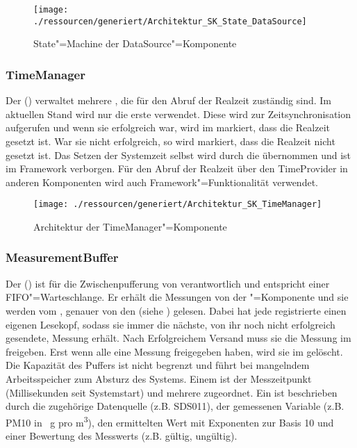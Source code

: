 \begin{figure}[!htb]
    \centering
    \texttt{[image: ./ressourcen/generiert/Architektur\_SK\_State\_DataSource]}
    \caption{State"=Machine der DataSource"=Komponente}
    \label{fig:Architektur_SK_State_DataSource}
\end{figure}

\subsubsection{TimeManager}
Der  () verwaltet mehrere , die für den Abruf der Realzeit zuständig sind.
Im aktuellen Stand wird nur die erste  verwendet.
Diese wird zur Zeitsynchronisation aufgerufen und wenn sie erfolgreich war, wird im  markiert, dass die Realzeit gesetzt ist.
War sie nicht erfolgreich, so wird markiert, dass die Realzeit nicht gesetzt ist.
Das Setzen der Systemzeit selbst wird durch die  übernommen und ist im Framework verborgen.
Für den Abruf der Realzeit über den TimeProvider in anderen Komponenten wird auch Framework"=Funktionalität verwendet.

\begin{figure}[!htb]
\centering
\texttt{[image: ./ressourcen/generiert/Architektur\_SK\_TimeManager]}
\caption{Architektur der TimeManager"=Komponente}
\label{fig:Architektur_SK_TimeManager}
\end{figure}

\subsubsection{MeasurementBuffer}
Der  () ist für die Zwischenpufferung von  verantwortlich und entspricht einer FIFO"=Warteschlange.
Er erhält die Messungen von der "=Komponente und sie werden vom , genauer von den  (siehe ) gelesen.
Dabei hat jede registrierte  einen eigenen Lesekopf, sodass sie immer die nächste, von ihr noch nicht erfolgreich gesendete, Messung erhält.
Nach Erfolgreichem Versand muss sie die Messung im  freigeben.
Erst wenn alle  eine Messung freigegeben haben, wird sie im  gelöscht.
Die Kapazität des Puffers ist nicht begrenzt und führt bei mangelndem Arbeitsspeicher zum Absturz des Systems.
Einem  ist der Messzeitpunkt (Millisekunden seit Systemstart) und mehrere  zugeordnet.
Ein  ist beschrieben durch die zugehörige Datenquelle (z.B. SDS011), der gemessenen Variable (z.B. PM10 in \si{\mu g} pro \si{m^3}), den ermittelten Wert mit Exponenten zur Basis 10 und einer Bewertung des Messwerts (z.B. gültig, ungültig).

